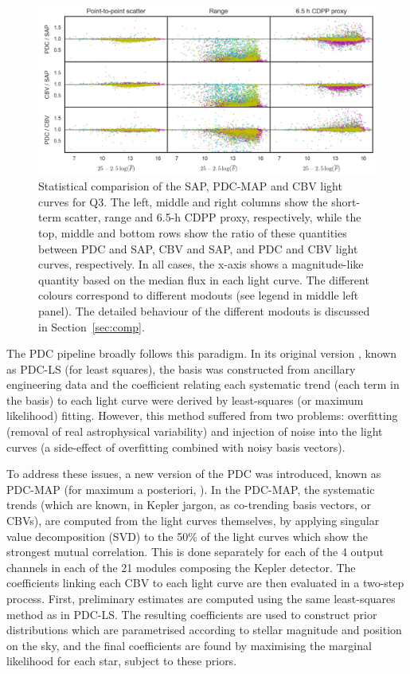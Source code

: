 \documentclass[useAMS,usenatbib]{mn2e}
\begin{document}
\begin{figure}
  \centering
  \includegraphics[width=\linewidth]{arc2_stats_q3.png} 
  \caption{Statistical comparision of the SAP, PDC-MAP and CBV light
    curves for Q3. The left, middle and right columns show the short-term scatter, range and 6.5-h CDPP proxy, respectively, while the top, middle and bottom rows show the ratio of these quantities between PDC and SAP, CBV and SAP, and PDC and CBV light curves, respectively. 
    In all cases, the x-axis shows a magnitude-like
    quantity based on the median flux in each light curve. The
    different colours correspond to different modouts (see legend in
    middle left panel). The detailed behaviour of the different modouts is discussed
  in Section~\ref{sec:comp}.}
  \label{fig:sig_ran_comp}
\end{figure}

The PDC pipeline broadly follows this paradigm. In its original
version \citep{twi+10a,twi+10b}, known as PDC-LS (for least squares),
the basis was constructed from ancillary engineering data and the
coefficient relating each systematic trend (each term in the basis) to
each light curve were derived by least-squares (or maximum likelihood)
fitting. However, this method suffered from two problems: overfitting
(removal of real astrophysical variability) and injection of noise
into the light curves (a side-effect of overfitting combined with
noisy basis vectors). 

To address these issues, a new version of the PDC was introduced,
known as PDC-MAP (for maximum a posteriori, \citealt{smi+12}). In the
PDC-MAP, the systematic trends (which are known, in Kepler jargon, as
co-trending basis vectors, or CBVs), are computed from the light curves
themselves, by applying singular value decomposition (SVD) to the 50\%
of the light curves which show the strongest mutual correlation. This
is done separately for each of the 4 output channels in each of the 21
modules composing the Kepler detector. The
coefficients linking each CBV to each light curve are then evaluated
in a two-step process. First, preliminary estimates are computed using
the same least-squares method as in PDC-LS. The resulting coefficients
are used to construct prior distributions which are parametrised
according to stellar magnitude and position on the sky, and the final
coefficients are found by maximising the marginal likelihood for each
star, subject to these priors.
\end{document}

